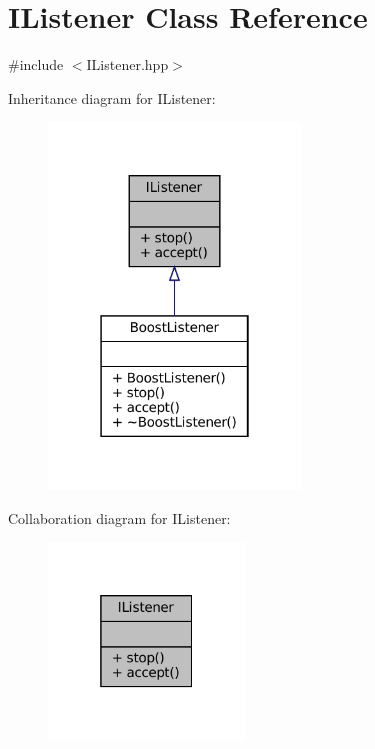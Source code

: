 \hypertarget{classIListener}{}\section{I\+Listener Class Reference}
\label{classIListener}


{\ttfamily \#include $<$I\+Listener.\+hpp$>$}



Inheritance diagram for I\+Listener\+:
\nopagebreak
\begin{figure}[H]
\begin{center}
\leavevmode
\includegraphics[width=190pt]{classIListener__inherit__graph}
\end{center}
\end{figure}


Collaboration diagram for I\+Listener\+:
\nopagebreak
\begin{figure}[H]
\begin{center}
\leavevmode
\includegraphics[width=148pt]{classIListener__coll__graph}
\end{center}
\end{figure}
